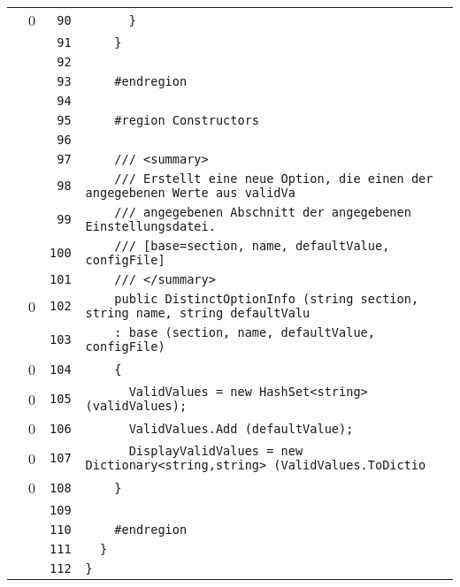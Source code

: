 \documentclass[a4paper,10pt]{article}
\begin{document}
\begin{longtable}[l]{lrrl}
\cellcolor{red} & 0 & \verb~90~ & \verb~      }~\\
\cellcolor{gray} &  & \verb~91~ & \verb~    }~\\
\cellcolor{gray} &  & \verb~92~ & \verb~~\\
\cellcolor{gray} &  & \verb~93~ & \verb~    #endregion~\\
\cellcolor{gray} &  & \verb~94~ & \verb~~\\
\cellcolor{gray} &  & \verb~95~ & \verb~    #region Constructors~\\
\cellcolor{gray} &  & \verb~96~ & \verb~~\\
\cellcolor{gray} &  & \verb~97~ & \verb~    /// <summary>~\\
\cellcolor{gray} &  & \verb~98~ & \verb~    /// Erstellt eine neue Option, die einen der angegebenen Werte aus validVa~\\
\cellcolor{gray} &  & \verb~99~ & \verb~    /// angegebenen Abschnitt der angegebenen Einstellungsdatei.~\\
\cellcolor{gray} &  & \verb~100~ & \verb~    /// [base=section, name, defaultValue, configFile]~\\
\cellcolor{gray} &  & \verb~101~ & \verb~    /// </summary>~\\
\cellcolor{red} & 0 & \verb~102~ & \verb~    public DistinctOptionInfo (string section, string name, string defaultValu~\\
\cellcolor{gray} &  & \verb~103~ & \verb~    : base (section, name, defaultValue, configFile)~\\
\cellcolor{red} & 0 & \verb~104~ & \verb~    {~\\
\cellcolor{red} & 0 & \verb~105~ & \verb~      ValidValues = new HashSet<string> (validValues);~\\
\cellcolor{red} & 0 & \verb~106~ & \verb~      ValidValues.Add (defaultValue);~\\
\cellcolor{red} & 0 & \verb~107~ & \verb~      DisplayValidValues = new Dictionary<string,string> (ValidValues.ToDictio~\\
\cellcolor{red} & 0 & \verb~108~ & \verb~    }~\\
\cellcolor{gray} &  & \verb~109~ & \verb~~\\
\cellcolor{gray} &  & \verb~110~ & \verb~    #endregion~\\
\cellcolor{gray} &  & \verb~111~ & \verb~  }~\\
\cellcolor{gray} &  & \verb~112~ & \verb~}~\\
\end{longtable}
\newpage
\end{document}
